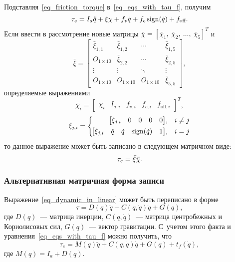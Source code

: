 Подставляя~\eqref{eq_friction_torque} в~\eqref{eq_eqs_with_tau_f}, получим
\begin{equation}
     \tau_e = I_a \ddot{q} + \xi \chi + f_v \dot{q} + f_c \operatorname{sign}(\dot{q}) + f_\text{off}\ldotp
\end{equation}
Если ввести в рассмотрение новые матрицы $\bar{\chi}=[\bar{\chi}_1, \: \bar\chi_2, \: \ldots, \: \bar\chi_5]^T$ и\linebreak
\begin{equation}
    \bar\xi =
    \begin{bmatrix}
        \bar\xi_{1,1} & \bar\xi_{1,2} & \cdots & \bar\xi_{1,5} \\
        O_{1 \times 10} & \bar\xi_{2,2} & \cdots & \bar\xi_{2,5} \\
        \vdots & \vdots & \ddots & \vdots \\
        O_{1 \times 10} & O_{1 \times 10} & O_{1 \times 10} & \bar\xi_{5,5}
    \end{bmatrix}\!\!,
\end{equation}
определяемые выражениями
\begin{equation}
    \bar{\chi}_i =
    \begin{bmatrix}
        \chi_i & I_{a,i} & f_{v,i} & f_{c,i} & f_{\text{off},i}
    \end{bmatrix}^T\!\!\!\!,
\end{equation}
\begin{equation}
    \bar{\xi}_{j,i} =
    \left\{
    \begin{aligned}
        \!\begin{bmatrix}\xi_{j,i} & 0 & 0 & 0 & 0\end{bmatrix}&, && i \ne j \\
        \!\begin{bmatrix}\xi_{j,i} & \ddot{q} & \dot{q} & \operatorname{sign}(\dot{q}) & 1\end{bmatrix}&, &&i = j
	\end{aligned}
	\right.
\end{equation}
то данное выражение может быть записано в следующем матричном виде:
\begin{equation}\label{eq_extended_dynamic_in_linear}
    \tau_e = \bar\xi \bar\chi \ldotp
\end{equation}

\subsubsection{Альтернативная матричная форма записи}
Выражение~\eqref{eq_dynamic_in_linear} может быть переписано в форме
\begin{equation}
    \tau = D(q) \ddot{q} + C(q,\dot{q}) \dot{q} + G(q),
\end{equation}
где $D(q)$~--- матрица инерции, $C(q,\dot{q})$~--- матрица центробежных и Кориолисовых сил, $G(q)$~--- вектор гравитации.
С~учетом этого факта и уравнения~\eqref{eq_eqs_with_tau_f} можно получить, что
\begin{equation}
    \tau_e = M(q) \ddot{q} + C(q,\dot{q}) \dot{q} + G(q) + t_f(\dot{q}),
\end{equation}
где $M(q) = I_a + D(q)$.

